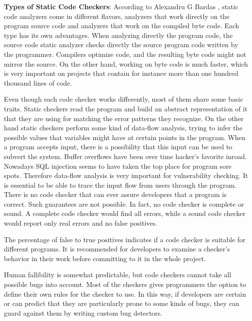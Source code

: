 \textbf{Types of Static Code Checkers}: According to Alexandru G Bardas \cite{ref_91_bardas2010static}, static code analyzers come in different flavors, analyzers that work directly on the
program source code and analyzers that work on the compiled byte code. Each type has its own advantages. When analyzing directly the program code, the source code static analyzer checks directly the source program code written by the programmer. Compilers optimize code, and the resulting byte code might not mirror the source. On the other hand, working on byte code is much faster, which is very important on
projects that contain for instance more than one hundred thousand lines of code.

Even though each code checker works differently, most of them share some basic traits. Static checkers read the program and build an abstract representation of it that they are using for matching the error patterns they recognize. On the other hand static checkers
perform some kind of data-flow analysis, trying to infer the possible values that variables might have at certain points in the program. When a program accepts input, there is a possibility that this input can be used to subvert the system. Buffer overflows have been over time hacker's favorite inroad. Nowadays SQL injection seems to have taken the top
place for program sore spots. Therefore data-flow analysis is very important for vulnerability checking. It is essential to be able to trace the input flow from users through the program. There is no code checker that can ever assure developers that a program is correct. Such guarantees are not possible. In fact, no code checker is complete or sound. A complete code checker would find all errors, while a sound code checker would report only real errors and no false positives.

The percentage of false to true positives indicates if a code checker is suitable for different programs. It is recommended for developers to examine a checker's behavior in their work before committing to it in the whole project. 

Human fallibility is somewhat predictable, but code checkers cannot take all possible bugs into account. Most of the checkers gives programmers the option to define their own rules for the checker to use. In this way, if developers are certain or can predict that they
are particularly prone to some kinds of bugs, they can guard against them by writing custom bug detectors. 

